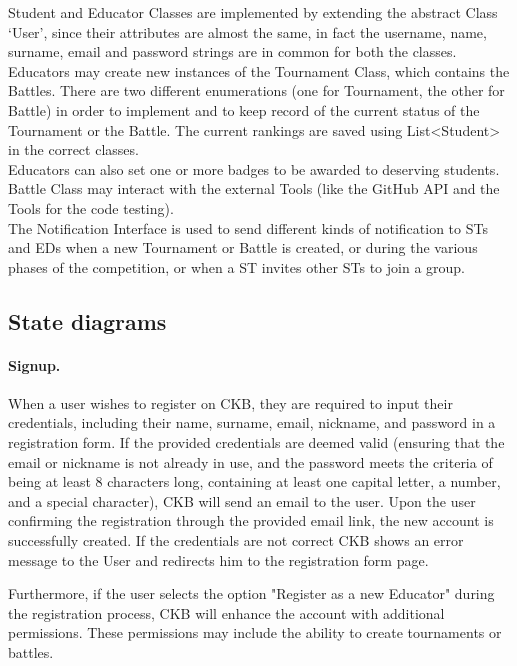 Student and Educator Classes are implemented by extending the abstract Class ‘User’, since their attributes are almost the same, in fact the username, name, surname, email and password strings are in common for both the classes.\\
Educators may create new instances of the Tournament Class, which contains the Battles. There are two different enumerations (one for Tournament, the other for Battle) in order to implement and to keep record of the current status of the Tournament or the Battle. The current rankings are saved using List<Student> in the correct classes. \\
Educators can also set one or more badges to be awarded to deserving students. Battle Class may interact with the external Tools (like the GitHub API and the Tools for the code testing). \\
The Notification Interface is used to send different kinds of notification to STs and EDs when a new Tournament or Battle is created, or during the various phases of the competition, or when a ST invites other STs to join a group.\\


\subsection{State diagrams}
\label{subsec:state_diagrams}%
\paragraph{Signup.}
When a user wishes to register on CKB, they are required to input their credentials, including their name, surname, email, nickname, and password in a registration form. If the provided credentials are deemed valid (ensuring that the email or nickname is not already in use, and the password meets the criteria of being at least 8 characters long, containing at least one capital letter, a number, and a special character), CKB will send an email to the user. Upon the user confirming the registration through the provided email link, the new account is successfully created. If the credentials are not correct CKB shows an error message to the User and redirects him to the registration form page.

Furthermore, if the user selects the option "Register as a new Educator" during the registration process, CKB will enhance the account with additional permissions. These permissions may include the ability to create tournaments or battles.

